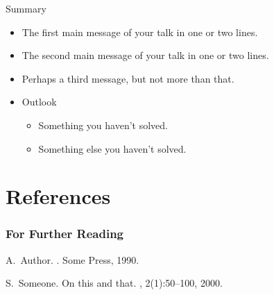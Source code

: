 \documentclass{beamer}
\begin{document}
\begin{frame}{Summary}
  \begin{itemize}
  \item
    The \alert{first main message} of your talk in one or two lines.
  \item
    The \alert{second main message} of your talk in one or two lines.
  \item
    Perhaps a \alert{third message}, but not more than that.
  \end{itemize}

  \begin{itemize}
  \item
    Outlook
    \begin{itemize}
    \item
      Something you haven't solved.
    \item
      Something else you haven't solved.
    \end{itemize}
  \end{itemize}
\end{frame}

\section{References}  

\begin{frame}[allowframebreaks]
  \frametitle<presentation>{For Further Reading}

  \begin{thebibliography}{10}

  \beamertemplatebookbibitems

    A.~Author.
    .
    \newblock Some Press, 1990.


  \beamertemplatearticlebibitems

    S.~Someone.
    \newblock On this and that.
    , 2(1):50--100,
    2000.
  \end{thebibliography}
\end{frame}
\end{document}

